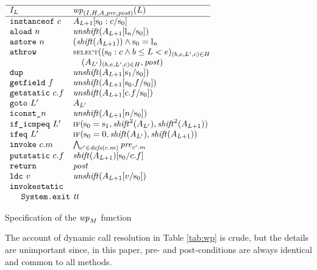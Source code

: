 \documentclass[10pt,twocolumn]{article}
\newcommand{\Pre}{\mathit{pre}}
\newcommand{\Post}{\mathit{post}}
\newcommand{\WP}{{\it wp}}
\newcommand{\SHIFT}{\mathit{shift}}
\newcommand{\IF}{\mbox{\sc if}}
\newcommand{\UNSHIFT}{\mathit{unshift}}
\newcommand{\SELECT}{\mbox{\sc select}}
\newcommand{\True}{\mbox{\it tt}}
\newcommand{\Stack}{\mathrm{s}}
\newcommand{\Local}{\mathrm{l}}
\begin{document}
\begin{table}
$\begin{array}{l@{~}l@{}}
\hline
I_L                        & \WP_{(I, H, A, \Pre, \Post)}(L) \\ \hline
\mbox{\tt instanceof}\ c   & A_{L+1}[\Stack_0 : c/\Stack_0] \\
\mbox{\tt aload}\ n        &  \UNSHIFT(A_{L+1}[\Local_n/\Stack_0]) \\
\mbox{\tt astore}\ n       & (\SHIFT(A_{L+1}))\wedge \Stack_0 = \Local_n \\
\mbox{\tt athrow}          & \mbox{\small\SELECT}((\Stack_0:c\wedge b\leq L < e)_{(b,e,L',c)\in H} \\
                           & \ \ \ (A_{L'})_{(b,e,L',c)\in H},\Post) \\
\mbox{\tt dup}             & \UNSHIFT (A_{L+1}[\Stack_1/\Stack_0]) \\
\mbox{\tt getfield}\ f     & \UNSHIFT (A_{L+1}[\Stack_0.f/\Stack_0]) \\
\mbox{\tt getstatic}\ c.f  & \UNSHIFT (A_{L+1}[c.f/\Stack_0]) \\
\mbox{\tt goto}\ L'        & A_{L'}  \\
\mbox{\tt iconst\_}n       & \UNSHIFT(A_{L+1}[n/\Stack_0]) \\
\mbox{\tt if\_icmpeq}~L'   & \IF(\Stack_0=\Stack_1,\SHIFT^2(A_{L'}),\SHIFT^2(A_{L+1}))\\
\mbox{\tt ifeq}\ L'        & \IF(\Stack_0=0,\SHIFT(A_{L'}), \SHIFT(A_{L+1})) \\
\mbox{\tt invoke}\ c.m     & \bigwedge_{c' \in \mathit{defs}(c.m)} \Pre_{c'.m} \\
\mbox{\tt putstatic}\ c.f  & \SHIFT(A_{L+1})[\Stack_0/c.f] \\
\mbox{\tt return}          & \Post \\
\mbox{\tt ldc}\ v          & \UNSHIFT(A_{L+1}[v/\Stack_0]) \\
\mbox{\tt invokestatic}    & \\
\ \ \ \ \mbox{\tt System.exit} & \True
\end{array}$
\caption{Specification of the $\WP_M$ function}
\label{tab:wp}
\end{table}
The account of dynamic call resolution in Table \ref{tab:wp} is crude, 
but the details are unimportant since, in this paper, pre- and 
post-conditions are always identical and common to all methods.
\end{document}
